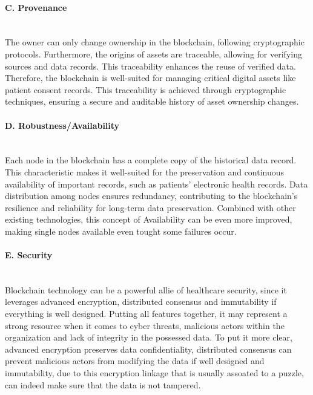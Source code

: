 \paragraph{C. Provenance} \mbox{}\\
The owner can only change ownership in the blockchain, following cryptographic protocols. Furthermore, the origins of assets are traceable, allowing for verifying sources and data records. This traceability enhances the reuse of verified data. Therefore, the blockchain is well-suited for managing critical digital assets like patient consent records. This traceability is achieved through cryptographic techniques, ensuring a secure and auditable history of asset ownership changes.

\paragraph{D. Robustness/Availability}\mbox{}\\
Each node in the blockchain has a complete copy of the historical data record. This characteristic makes it well-suited for the preservation and continuous availability of important records, such as patients' electronic health records. Data distribution among nodes ensures redundancy, contributing to the blockchain's resilience and reliability for long-term data preservation. Combined with other existing technologies, this concept of Availability can be even more improved, making single nodes available even tought some failures occur.

\paragraph{E. Security} \mbox{}\\
Blockchain technology can be a powerful allie of healthcare security, since it leverages advanced encryption, distributed consensus and immutability if everything is well designed. Putting all features together, it may represent a strong resource when it comes to cyber threats, malicious actors within the organization and lack of integrity in the possessed data. To put it more clear, advanced encryption preserves data confidentiality, distributed consensus can prevent malicious actors from modifying the data if well designed and immutability, due to this encryption linkage that is usually assoated to a puzzle, can indeed make sure that the data is not tampered.

